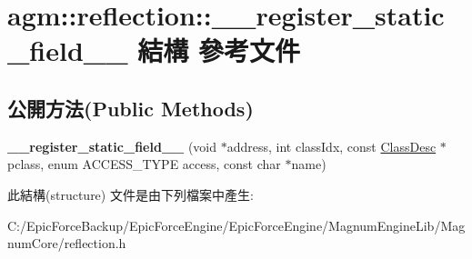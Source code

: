 \hypertarget{structagm_1_1reflection_1_1____register__static__field____}{}\section{agm\+:\+:reflection\+:\+:\+\_\+\+\_\+register\+\_\+static\+\_\+field\+\_\+\+\_\+ 結構 參考文件}
\label{structagm_1_1reflection_1_1____register__static__field____}
\subsection*{公開方法(Public Methods)}
\begin{DoxyCompactItemize}
\item 
{\bfseries \+\_\+\+\_\+register\+\_\+static\+\_\+field\+\_\+\+\_\+} (void $\ast$address, int class\+Idx, const \hyperlink{classagm_1_1reflection_1_1_class_desc}{Class\+Desc} $\ast$pclass, enum A\+C\+C\+E\+S\+S\+\_\+\+T\+Y\+PE access, const char $\ast$name)\hypertarget{structagm_1_1reflection_1_1____register__static__field_____ac1ddcd512e283905c668ccd15df85753}{}\label{structagm_1_1reflection_1_1____register__static__field_____ac1ddcd512e283905c668ccd15df85753}

\end{DoxyCompactItemize}


此結構(structure) 文件是由下列檔案中產生\+:\begin{DoxyCompactItemize}
\item 
C\+:/\+Epic\+Force\+Backup/\+Epic\+Force\+Engine/\+Epic\+Force\+Engine/\+Magnum\+Engine\+Lib/\+Magnum\+Core/reflection.\+h\end{DoxyCompactItemize}
